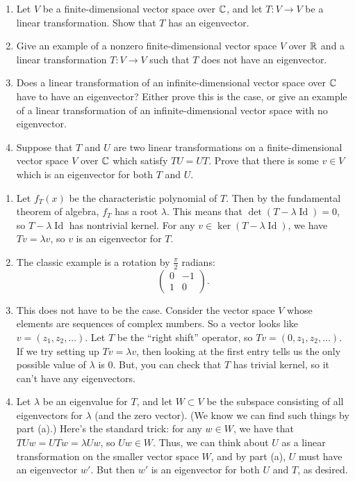 %
\begin{question}[subtitle= August 2014 Problem 3,ID=Aug14_3]
\begin{enumerate}
    \item Let $V$ be a finite-dimensional vector space over $\mathbb{C}$, and let $T\colon V \to V$ be a linear transformation. Show that $T$ has an eigenvector.
    \item Give an example of a nonzero finite-dimensional vector space $V$ over $\mathbb{R}$ and a linear transformation $T\colon V \to V$ such that $T$ does not have an eigenvector.
    \item Does a linear transformation of an infinite-dimensional vector space over $\mathbb{C}$ have to have an eigenvector?  Either prove this is the case, or give an example of a linear transformation of an infinite-dimensional vector space with no eigenvector.
    \item Suppose that $T$ and $U$ are two linear transformations on a finite-dimensional vector space $V$ over $\mathbb{C}$ which satisfy $TU = UT$. Prove that there is some $v \in V$ which is an eigenvector for both $T$ and $U$.
\end{enumerate}
\end{question}
\begin{solution}
\begin{enumerate}
    \item Let $f_T(x)$ be the characteristic polynomial of $T$. Then by the fundamental theorem of algebra, $f_T$ has a root $\lambda$. This means that $\det(T-\lambda \operatorname{Id}) = 0$, so $T-\lambda \operatorname{Id}$ has nontrivial kernel. For any $v \in \ker(T -\lambda \operatorname{Id})$, we have $Tv = \lambda v$, so $v$ is an eigenvector for $T$.
    \item The classic example is a rotation by $\frac{\pi}{2}$ radians:
    \[\begin{pmatrix}0&-1\\1&0\end{pmatrix}.\]
    \item This does not have to be the case. Consider the vector space $V$ whose elements are sequences of complex numbers. So a vector looks like $v = (z_1,z_2,\dots)$. Let $T$ be the ``right shift'' operator, so $Tv = (0,z_1,z_2,\dots)$. If we try setting up $Tv = \lambda v$, then looking at the first entry tells us the only possible value of $\lambda$ is 0. But, you can check that $T$ has trivial kernel, so it can't have any eigenvectors.
    \item Let $\lambda$ be an eigenvalue for $T$, and let $W \subset V$ be the subspace consisting of all eigenvectors for $\lambda$ (and the zero vector). (We know we can find such things by part (a).)  Here's the standard trick: for any $w \in W$, we have that $TUw = UTw = \lambda Uw$, so $Uw \in W$. Thus, we can think about $U$ as a linear transformation on the smaller vector space $W$, and by part (a), $U$ must have an eigenvector $w'$. But then $w'$ is an eigenvector for both $U$ and $T$, as desired.
\end{enumerate}
\end{solution}


